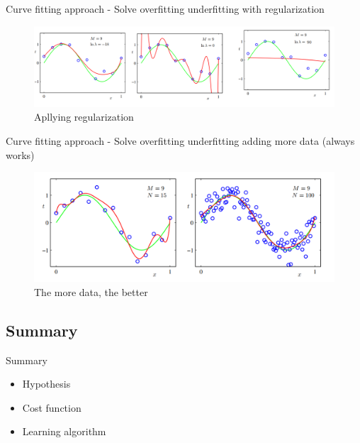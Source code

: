 \documentclass{beamer}
\begin{document}
\begin{frame}{ Curve fitting approach - Solve overfitting underfitting with regularization }
 \begin{figure}
  \centering
    \includegraphics[width=1.0\textwidth]{applyingreg}
  		\caption{ Apllying regularization }
    \label{tablereg}
 \end{figure}
\end{frame}

\begin{frame}{ Curve fitting approach - Solve overfitting underfitting adding more data (always works) }
 \begin{figure}
  \centering
    \includegraphics[width=1.1\textwidth]{moredata}
  		\caption{ The more data, the better }
    \label{tablereg}
 \end{figure}
\end{frame}


\subsection{Summary}
\begin{frame}{Summary}
\begin{itemize}
\setlength\itemsep{2em}
\item Hypothesis
\item Cost function
\item Learning algorithm
\end{itemize}
\end{frame}
\end{document}
